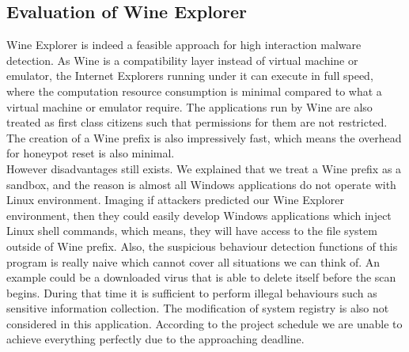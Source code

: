\subsection{Evaluation of Wine Explorer}
Wine Explorer is indeed a feasible approach for high interaction malware 
detection. As Wine is a compatibility layer instead of virtual machine or 
emulator, the Internet Explorers running under it can execute in full speed, 
where the computation resource consumption is minimal compared to what 
a virtual machine or emulator require. The applications run by Wine are also 
treated as first class citizens such that permissions for them are not 
restricted. The creation of a Wine prefix is also impressively fast, which 
means the overhead for honeypot reset is also minimal. \\
However disadvantages still exists. We explained that we treat a Wine prefix 
as a sandbox, and the reason is almost all Windows applications do not operate 
with Linux environment. Imaging if attackers predicted our Wine Explorer 
environment, then they could easily develop Windows applications which inject 
Linux shell commands, which means, they will have access to the file system 
outside of Wine prefix. Also, the suspicious behaviour detection functions of 
this program is really naive which cannot cover all situations we can think 
of. An example could
be a downloaded virus that is able to delete itself before the scan begins. 
During that time it is sufficient to perform illegal behaviours such as 
sensitive information collection. The modification of system 
registry is also not considered in this application. According to the project 
schedule we are unable to achieve everything perfectly due to the approaching 
deadline. 
